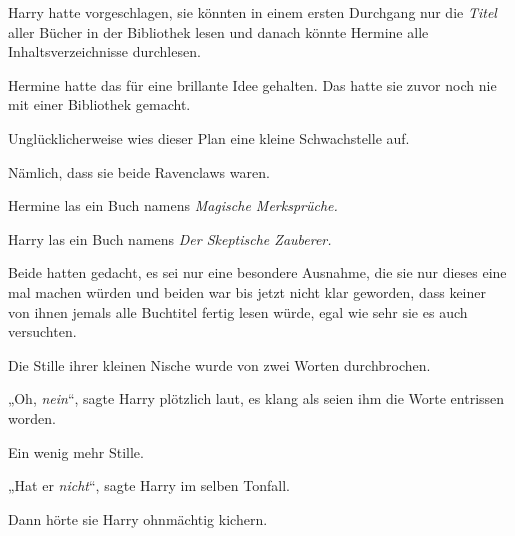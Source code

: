 Harry hatte vorgeschlagen, sie könnten in einem ersten Durchgang nur die \emph{Titel} aller Bücher in der Bibliothek lesen und danach könnte Hermine alle Inhaltsverzeichnisse durchlesen.

Hermine hatte das für eine brillante Idee gehalten. Das hatte sie zuvor noch nie mit einer Bibliothek gemacht.

Unglücklicherweise wies dieser Plan eine kleine Schwachstelle auf.

Nämlich, dass sie beide Ravenclaws waren.

Hermine las ein Buch namens \emph{Magische Merksprüche.}

Harry las ein Buch namens \emph{Der Skeptische Zauberer.}

Beide hatten gedacht, es sei nur eine besondere Ausnahme, die sie nur dieses eine mal machen würden und beiden war bis jetzt nicht klar geworden, dass keiner von ihnen jemals alle Buchtitel fertig lesen würde, egal wie sehr sie es auch versuchten.

Die Stille ihrer kleinen Nische wurde von zwei Worten durchbrochen.

„Oh, \emph{nein}“, sagte Harry plötzlich laut, es klang als seien ihm die Worte entrissen worden.

Ein wenig mehr Stille.

„Hat er \emph{nicht}“, sagte Harry im selben Tonfall.

Dann hörte sie Harry ohnmächtig kichern.

